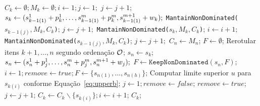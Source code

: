 \begin{algorithmic}[1] %
    \State $C_k \gets \emptyset; M_k \gets \emptyset; i \gets 1; j \gets 1;$
      \State $j \gets j + 1$;
    \EndWhile
      \State $s_k \gets (s_{k-1(1)}^1 + p_k^1,
        \ldots,
        s_{k-1(1)}^{m} + p_k^{m},
        s_{k-1(1)}^{m+1} + w_k);$
        \State \texttt{MantainNonDominated($s_{k-1(j)}, M_k, C_k$)}; $j \gets j + 1;$
      \EndWhile
      \State \texttt{MantainNonDominated($s_k, M_k, C_k$)}; $i \gets i + 1;$
    \EndWhile
      \State \texttt{MantainNonDominated($s_{k-1(j)}, M_k, C_k$)}; $j \gets j + 1;$
    \EndWhile
      \State $C_n \gets M_n$;
    \Else
      \State $F \gets \emptyset$;
          \State Rerotular itens $k+1, \ldots, n$ segundo ordenação $\mathcal{O}$;
          \State $s_n \gets s_k$;
              \State $s_n \gets (s_n^1 + p_j^1, \ldots, s_n^{m} + p_j^{m}, s_n^{m+1} + w_j);$
            \EndIf
          \EndFor
          \State $F \gets \texttt{KeepNonDominated}(s_n, F)$;
        \EndFor
      \EndFor
      \State $i \gets 1; remove \gets true; F \gets \{s_{n(1)}, \ldots, s_{n(h)}\}$;
        \State Computar limite superior $u$ para $s_{k(i)}$ conforme Equação~\ref{eq:upperb};
        \State $j \gets 1; remove \gets false$;
            \State $remove \gets true$;
          \Else
            \State $j \gets j + 1$;
          \EndIf
        \EndWhile
          \State $C_k \gets C_k\backslash \{s_{k(i)}\}; i \gets i + 1$;
        \EndIf
      \EndWhile
    \EndIf
  \State \Return $C_k$;
  \EndFunction
\end{algorithmic}
